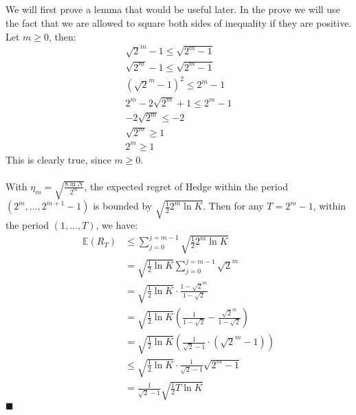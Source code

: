 \documentclass[a4paper]{article}
\newcommand{\expect}[1]{\mathbb{E}\left(#1\right)}
\newcommand*{\QEDA}{\hfill\ensuremath{\blacksquare}}%
\begin{document}
\subsection{}
\label{subsec:31}
We will first prove a lemma that would be useful later. In the prove we will use
the fact that we are allowed to square both sides of inequality if they are positive.
Let $m\geq0$, then:
\begin{align*}
  \sqrt{2}^m -1 \leq \sqrt{2^m -1}\\
  \sqrt{2^m} -1 \leq \sqrt{2^m -1}\\
  (\sqrt{2}^m -1)^2 \leq 2^m -1\\
  2^m - 2\sqrt{2^m} + 1 \leq 2^m - 1\\
  -2\sqrt{2^m} \leq  -2\\
  \sqrt{2^m} \geq  1\\
  2^m \geq  1
\end{align*}
This is clearly true, since $m\geq 0$.\\\\
With $\eta_{m}=\sqrt{\frac{8 \ln N}{2^{m}}}$, the expected regret of Hedge
within the period $(2^m,...,2^{m+1}-1)$ is bounded by $\sqrt{\frac{1}{2} 2^m\ln{K}}$.
Then for any $T=2^m - 1$, within the period $(1,...,T)$, we have:
\begin{align*}
  \expect{R_T} &\leq \sum_{j=0}^{j=m-1} \sqrt{\frac{1}{2}2^m\ln{K}}\\
  &=\sqrt{\frac{1}{2}\ln{K}}\sum_{j=0}^{j=m-1} \sqrt{2}^m\\
  &=\sqrt{\frac{1}{2}\ln{K}} \cdot \frac{1-\sqrt{2}^m}{1-\sqrt{2}} \tag{sum o
    geom. series}\\
  &=\sqrt{\frac{1}{2}\ln{K}} \left( \frac{1}{1-\sqrt{2}} - \frac{\sqrt{2}^m}{1-\sqrt{2}} \right)\\
  &=\sqrt{\frac{1}{2}\ln{K}} \left(
  \frac{1}{\sqrt{2}-1} \cdot  (\sqrt{2}^m -1)
  \right)\\
  &\leq \sqrt{\frac{1}{2}\ln{K}} \cdot \frac{1}{\sqrt{2} - 1} \sqrt{2^m - 1}
  \tag{by lemma, since $m\geq0$}\\
  &=\frac{1}{\sqrt{2} - 1} \sqrt{\frac{1}{2}T\ln{K}}
\end{align*}
\QEDA
\end{document}
